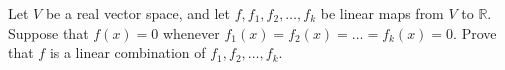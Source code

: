 \documentclass{article}
\begin{document}
	\setlength{\parindent}{0pt}
	Let $V$ be a real vector space, and let $f,f_1,f_2,\dots,f_k$ be linear maps from $V$ to $\mathbb{R}$. Suppose that $f(x)=0$ whenever $f_1(x)=f_2(x)=\dots=f_k(x)=0$. Prove that $f$ is a linear combination of $f_1,f_2,\dots,f_k$.
\end{document}
